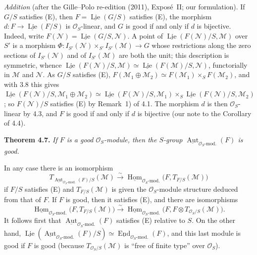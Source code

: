 \par\medskip\noindent
\emph{Addition} (after the Gille--Polo re-edition (2011), Expos\'e~II; our
formulation). If \(G/S\) satisfies (E), then
\(F=\underline{\operatorname{Lie}}(G/S)\) satisfies (E), the morphism
\(d\colon F\to\underline{\operatorname{Lie}}(F/S)\) is
\(\mathcal O_S\)-linear, and \(G\) is good if and only if \(d\) is
bijective. Indeed, write \(F(\mathcal N)=\underline{\operatorname{Lie}}(G/S,\mathcal N)\).
A point of \(\underline{\operatorname{Lie}}(F(\mathcal N)/S,\mathcal M)\)
over \(S'\) is a morphism
\(\Phi\colon I_{S'}(\mathcal N)\times_{S'}I_{S'}(\mathcal M)\to G\) whose
restrictions along the zero sections of \(I_{S'}(\mathcal N)\) and of
\(I_{S'}(\mathcal M)\) are both the unit; this description is symmetric,
whence \(\underline{\operatorname{Lie}}(F(\mathcal N)/S,\mathcal M)\simeq
\underline{\operatorname{Lie}}(F(\mathcal M)/S,\mathcal N)\), functorially
in \(\mathcal M\) and \(\mathcal N\). As \(G/S\) satisfies (E),
\(F(\mathcal M_1\oplus\mathcal M_2)\simeq F(\mathcal M_1)\times_S
F(\mathcal M_2)\), and with 3.8 this gives
\(\underline{\operatorname{Lie}}(F(\mathcal N)/S,\mathcal M_1\oplus\mathcal M_2)
\simeq\underline{\operatorname{Lie}}(F(\mathcal N)/S,\mathcal M_1)\times_S
\underline{\operatorname{Lie}}(F(\mathcal N)/S,\mathcal M_2)\); so
\(F(\mathcal N)/S\) satisfies (E) by Remark~1) of 4.1. The morphism \(d\)
is then \(\mathcal O_S\)-linear by 4.3, and \(F\) is good if and only if
\(d\) is bijective (our note to the Corollary of 4.4).
\par\medskip

\medskip
\noindent{}\textbf{Theorem 4.7.}
\textit{If \(F\) is a good \(\mathcal O_S\)-module, then the
\(S\)-group
\(\underline{\operatorname{Aut}}_{\mathcal O_S\text{-mod.}}(F)\)
is good.}

In any case there is an isomorphism
\[
 T_{\underline{\operatorname{Aut}}_{\mathcal O_S\text{-mod.}}(F)/S}(\mathcal M)
 \xrightarrow{\sim}
 \underline{\operatorname{Hom}}_{\mathcal O_S\text{-mod.}}
   \bigl(F,T_{F/S}(\mathcal M)\bigr)
\]
if \(F/S\) satisfies (E) and \(T_{F/S}(\mathcal M)\) is given the
\(\mathcal O_S\)-module structure deduced from that of \(F\). If \(F\) is
good, then it satisfies (E), and there are isomorphisms
\[
 \underline{\operatorname{Hom}}_{\mathcal O_S\text{-mod.}}
   \bigl(F,T_{F/S}(\mathcal M)\bigr)
 \xrightarrow{\sim}
 \underline{\operatorname{Hom}}_{\mathcal O_S\text{-mod.}}
   \bigl(F,F\otimes T_{\mathcal O_S/S}(\mathcal M)\bigr).
\]
It follows first that
\(\underline{\operatorname{Aut}}_{\mathcal O_S\text{-mod.}}(F)\) satisfies
(E) relative to \(S\). On the other hand,
\(\underline{\operatorname{Lie}}(\underline{\operatorname{Aut}}_{\mathcal O_S\text{-mod.}}(F)/S)
\simeq\underline{\operatorname{End}}_{\mathcal O_S\text{-mod.}}(F)\), and this
last module is good if \(F\) is good (because
\(T_{\mathcal O_S/S}(\mathcal M)\) is ``free of finite type'' over
\(\mathcal O_S\)).

